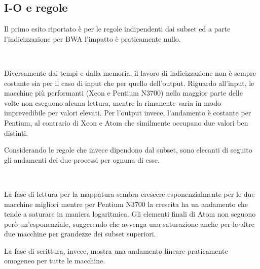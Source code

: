 \subsection{I-O e regole}
Il primo esito riportato è per le regole indipendenti dai subset ed a parte l'indicizzazione per BWA l'impatto è praticamente nullo.
\begin{figure}[H]
\centering
{} \quad
{} \\
\caption{}
\label{fig:RSSrng}
\end{figure}
Diversamente dai tempi e dalla memoria, il lavoro di indicizzazione non è sempre costante sia per il caso di input che per quello dell'output.
Riguardo all'input, le macchine più performanti (Xeon e Pentium N3700) nella maggior parte delle volte non eseguono alcuna lettura, mentre la rimanente varia in modo imprevedibile per valori elevati.
Per l'output invece, l'andamento è costante per Pentium, al contrario di Xeon e Atom che similmente occupano due valori ben distinti. 


Considerando le regole che invece dipendono dal subset, sono elecanti di seguito gli andamenti dei due processi per ognuna di esse.
\begin{figure}[H]
\centering
{} \quad
{} \\
\caption{}
\label{fig:IOm}
\end{figure}

La fase di lettura per la mappatura sembra crescere esponenzialmente per le due macchine migliori mentre per Pentium N3700 la crescita ha un andamento che tende a saturare in maniera logaritmica. 
Gli elementi finali di Atom non seguono però un'esponenziale, suggerendo che avvenga una saturazione anche per le altre due macchine per grandezze dei subset superiori.

La fase di scrittura, invece, mostra una andamento lineare praticamente omogeneo per tutte le macchine.  

\begin{figure}[H]
\centering
{} \quad
{} \\
\caption{}
\label{fig:IOSp}
\end{figure}

